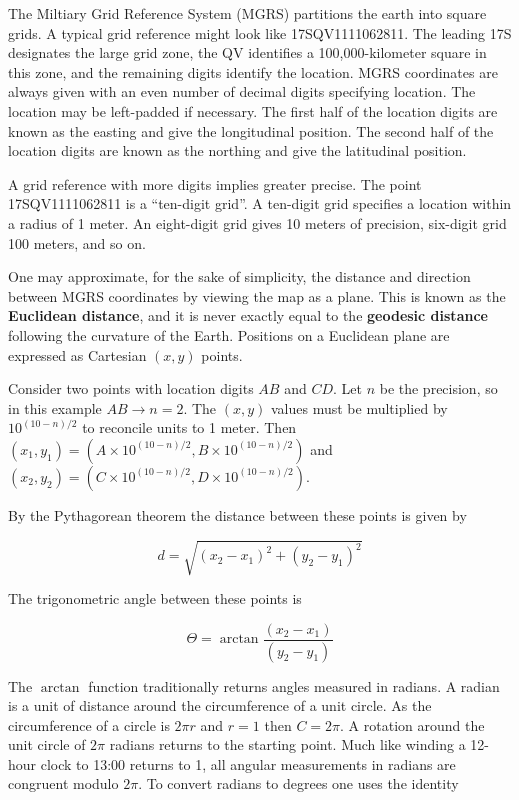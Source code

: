\documentclass{book}
\begin{document}
The Miltiary Grid Reference System (MGRS) partitions the earth into square grids. A typical grid reference might look like 17SQV1111062811. The leading 17S designates the large grid zone, the QV identifies a 100,000-kilometer square in this zone, and the remaining digits identify the location. MGRS coordinates are always given with an even number of decimal digits specifying location. The location may be left-padded if necessary. The first half of the location digits are known as the easting and give the longitudinal position. The second half of the location digits are known as the northing and give the latitudinal position.

A grid reference with more digits implies greater precise. The point 17SQV1111062811 is a ``ten-digit grid''. A ten-digit grid specifies a location within a radius of 1 meter. An eight-digit grid gives 10 meters of precision, six-digit grid 100 meters, and so on.

One may approximate, for the sake of simplicity, the distance and direction between MGRS coordinates by viewing the map as a plane. This is known as the \textbf{Euclidean distance}, and it is never exactly equal to the \textbf{geodesic distance} following the curvature of the Earth. Positions on a Euclidean plane are expressed as Cartesian $(x,y)$ points.

Consider two points with location digits $AB$ and $CD$. Let $n$ be the precision, so in this example $AB \to n=2$. The $(x,y)$ values must be multiplied by $10^{{(10-n)}/2}$ to reconcile units to 1 meter. Then $(x_1,y_1) = (A \times 10^{{(10 - n)}/2}, B \times 10^{{(10 - n)}/2})$ and $(x_2,y_2) = (C \times 10^{{(10 - n)}/2}, D \times 10^{{(10 - n)}/2})$.

By the Pythagorean theorem the distance between these points is given by 

\begin{equation}
d = \sqrt{(x_2 - x_1)^2 + (y_2 - y_1)^2}
\end{equation}

The trigonometric angle between these points is

\begin{equation}
\Theta = \arctan{\frac{(x_2 - x_1)}{(y_2 - y_1)}}
\end{equation}

The $\arctan$ function traditionally returns angles measured in radians. A radian is a unit of distance around the circumference of a unit circle. As the circumference of a circle is $2 \pi r$ and $r=1$ then $C=2\pi$. A rotation around the unit circle of $2\pi$ radians returns to the starting point. Much like winding a 12-hour clock to 13:00 returns to 1, all angular measurements in radians are congruent modulo $2\pi$. To convert radians to degrees one uses the identity
\end{document}
